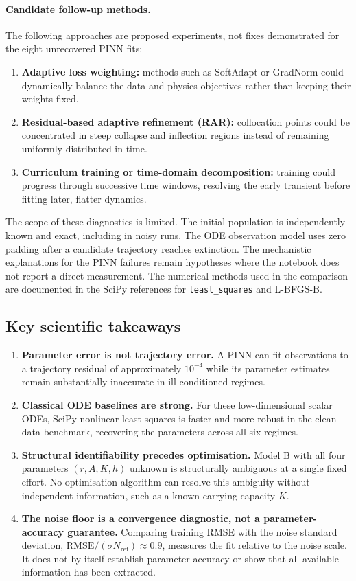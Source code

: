 \paragraph{Candidate follow-up methods.}
The following approaches are proposed experiments, not fixes demonstrated
for the eight unrecovered PINN fits:
\begin{enumerate}
  \item \textbf{Adaptive loss weighting:} methods such as SoftAdapt or
  GradNorm could dynamically balance the data and physics objectives
  rather than keeping their weights fixed.
  \item \textbf{Residual-based adaptive refinement (RAR):} collocation
  points could be concentrated in steep collapse and inflection regions
  instead of remaining uniformly distributed in time.
  \item \textbf{Curriculum training or time-domain decomposition:}
  training could progress through successive time windows, resolving the
  early transient before fitting later, flatter dynamics.
\end{enumerate}

The scope of these diagnostics is limited. The initial population is
independently known and exact, including in noisy runs. The ODE observation
model uses zero padding after a candidate trajectory reaches extinction.
The mechanistic explanations for the PINN failures remain hypotheses where
the notebook does not report a direct measurement. The numerical methods used in the comparison are documented in the SciPy
references for \texttt{least\_squares} and L-BFGS-B.

\subsection{Key scientific takeaways}
\label{sec:wp05_takeaways}

\begin{enumerate}
  \item \textbf{Parameter error is not trajectory error.} A PINN can fit
  observations to a trajectory residual of approximately $10^{-4}$ while
  its parameter estimates remain substantially inaccurate in
  ill-conditioned regimes.
  \item \textbf{Classical ODE baselines are strong.} For these
  low-dimensional scalar ODEs, SciPy nonlinear least squares is faster
  and more robust in the clean-data benchmark, recovering the parameters
  across all six regimes.
  \item \textbf{Structural identifiability precedes optimisation.}
  Model B with all four parameters $(r,A,K,h)$ unknown is structurally
  ambiguous at a single fixed effort. No optimisation algorithm can
  resolve this ambiguity without independent information, such as a
  known carrying capacity $K$.
  \item \textbf{The noise floor is a convergence diagnostic, not a
  parameter-accuracy guarantee.} Comparing training RMSE with the noise
  standard deviation,
  $\mathrm{RMSE}/(\sigma N_{\mathrm{ref}})\approx0.9$,
  measures the fit relative to the noise scale. It does not by itself
  establish parameter accuracy or show that all available information
  has been extracted.
\end{enumerate}